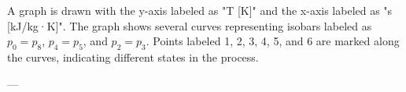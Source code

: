A graph is drawn with the y-axis labeled as "T [K]" and the x-axis labeled as "s [kJ/kg·K]". The graph shows several curves representing isobars labeled as \( p_0 = p_8 \), \( p_4 = p_5 \), and \( p_2 = p_3 \). Points labeled 1, 2, 3, 4, 5, and 6 are marked along the curves, indicating different states in the process.

---